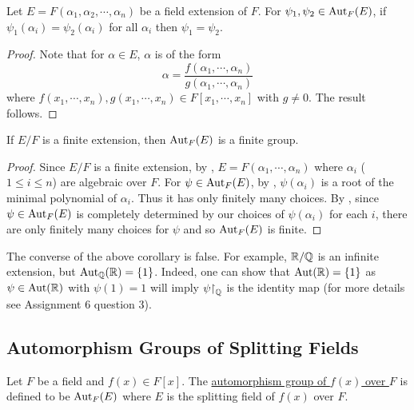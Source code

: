 \documentclass[11pt]{article}
\begin{document}
\begin{lemma}
    Let $E=F(\alpha_1,\alpha_2,\cdots,\alpha_n)$ be a field extension of $F$. For $\psi_1,\psi_2\in\operatorname{Aut}_F(E)$, if $\psi_1(\alpha_i)=\psi_2(\alpha_i)$ for all $\alpha_i$ then $\psi_1=\psi_2$.
\end{lemma}

\begin{proof}
    Note that for $\alpha\in E$, $\alpha$ is of the form 
    \[\alpha=\frac{f(\alpha_1,\cdots,\alpha_n)}{g(\alpha_1,\cdots,\alpha_n)}\]
    where $f(x_1,\cdots,x_n),g(x_1,\cdots,x_n)\in F[x_1,\cdots,x_n]$ with $g\neq0$. The result follows.
    
\end{proof}

\begin{corollary}
    If $E/F$ is a finite extension, then $\operatorname{Aut}_F(E)$ is a finite group.
\end{corollary}

\begin{proof}
    Since $E/F$ is a finite extension, by , $E=F(\alpha_1,\cdots,\alpha_n)$ where $\alpha_i$ ($1\leq i\leq n$) are algebraic over $F$. For $\psi\in\operatorname{Aut}_F(E)$, by , $\psi(\alpha_i)$ is a root of the minimal polynomial of $\alpha_i$. Thus it has only finitely many choices. By , since $\psi\in\operatorname{Aut}_F(E)$ is completely determined by our choices of $\psi(\alpha_i)$ for each $i$, there are only finitely many choices for $\psi$ and so $\operatorname{Aut}_F(E)$ is finite.
    
\end{proof}

\begin{remark}
    The converse of the above corollary is false. For example, $\mathbb{R}/\mathbb{Q}$ is an infinite extension, but $\operatorname{Aut}_{\mathbb{Q}}(\mathbb{R})=\{1\}$. Indeed, one can show that $\operatorname{Aut}(\mathbb{R})=\{1\}$ as $\psi\in\operatorname{Aut}(\mathbb{R})$ with $\psi(1)=1$ will imply $\psi{\upharpoonright}_{\mathbb{Q}}$ is the identity map (for more details see Assignment 6 question 3).
\end{remark}

\subsection{Automorphism Groups of Splitting Fields}

\begin{definition}
    Let $F$ be a field and $f(x)\in F[x]$. The \ul{automorphism group of $f(x)$ over $F$} is defined to be $\operatorname{Aut}_F(E)$ where $E$ is the splitting field of $f(x)$ over $F$.
\end{definition}
\end{document}
